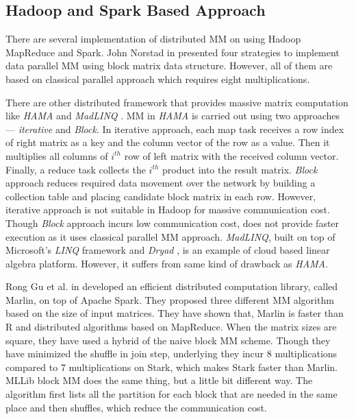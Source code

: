 \subsection{Hadoop and Spark Based Approach}
There are several implementation of distributed MM on using Hadoop MapReduce and Spark. John Norstad in \cite{norstad} presented four strategies to implement data parallel MM using block matrix data structure. However, all of them are based on classical parallel approach which requires eight multiplications.

There are other distributed framework that provides massive matrix computation like \textit{HAMA} \cite{seo2010hama} and \textit{MadLINQ} \cite{qian2012madlinq}. MM in \textit{HAMA} is carried out using two approaches --- \textit{iterative} and \textit{Block}. In iterative approach, each map task receives a row index of right matrix as a key and the column vector of the row as a value. Then it multiplies all columns of $i^{th}$ row of left matrix with the received column vector. Finally, a reduce task collects the $i^{th}$ product into the result matrix. \textit{Block} approach reduces required data movement over the network by building a collection table and placing candidate block matrix in each row. However, iterative approach is not suitable in Hadoop for massive communication cost. Though \textit{Block} approach incurs low communication cost, does not provide faster execution as it uses classical parallel MM approach. \textit{MadLINQ}, built on top of Microsoft's \textit{LINQ} framework and \textit{Dryad} \cite{isard2007dryad}, is an example of cloud based linear algebra platform. However, it suffers from same kind of drawback as \textit{HAMA}.

Rong Gu et al. in \cite{gu2015efficient} developed an efficient distributed computation library, called Marlin, on top of Apache Spark. They proposed three different MM algorithm based on the size of input matrices. They have shown that, Marlin is faster than R and distributed algorithms based on MapReduce. When the matrix sizes are square, they have used a hybrid of the naive block MM scheme. Though they have minimized the shuffle in join step, underlying they incur 8 multiplications compared to 7 multiplications on Stark, which makes Stark faster than Marlin. MLLib block MM does the same thing, but a little bit different way. The algorithm first lists all the partition for each block that are needed in the same place and then shuffles, which reduce the communication cost.


